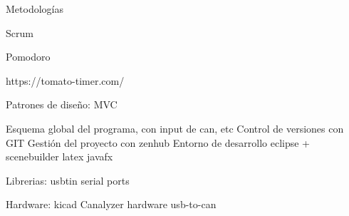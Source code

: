 
Metodologías

Scrum



Pomodoro

https://tomato-timer.com/



Patrones de diseño:
MVC

Esquema global del programa, con input de can, etc
Control de versiones con GIT
Gestión del proyecto con zenhub
Entorno de desarrollo eclipse + scenebuilder
latex
javafx

Librerias:
usbtin
serial ports

Hardware:
kicad
Canalyzer
hardware usb-to-can